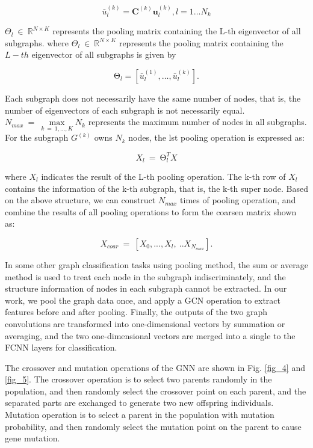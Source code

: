 \documentclass[lettersize,journal]{IEEEtran}
\begin{document}
\begin{equation}
\label{deqn_ex_3}
{\bar{u}}_l^{(k)}=\mathbf{C}^{(k)}\mathbf{u}_l^{(k)},l=1\ldots N_k
\end{equation}

$\Theta_l\ \in\ \mathbb{R}^{N\times K}$ represents the pooling matrix containing the L-th eigenvector of all subgraphs.
where $\Theta_l\ \in\ \mathbb{R}^{N\times K}$ represents the pooling matrix containing the $L-th$ eigenvector of all subgraphs is given by

\begin{equation}
\label{deqn_ex_4}
\mathrm{\Theta}_l=\left[{\bar{u}}_l^{\left(1\right)},\ldots,{\bar{u}}_l^{\left(k\right)}\right].
\end{equation}

Each subgraph does not necessarily have the same number of nodes, that is, the number of eigenvectors of each subgraph is not necessarily equal. $N_{max}\ =\ \underset{k\ =\ 1,...,K}\max{N_k}$ represents the maximum number of nodes in all subgraphs. For the subgraph $G^{(k)}$ owns $N_k$ nodes, the lst pooling operation is expressed as:

\begin{equation}
\label{deqn_ex_5}
X_l\ =\ \mathrm{\Theta}_l^TX
\end{equation}

where $X_l$ indicates the result of the L-th pooling operation. The k-th row of $X_l$ contains the information of the k-th subgraph, that is, the k-th super node. Based on the above structure, we can construct $N_{max}$ times of pooling operation, and combine the results of all pooling operations to form the coarsen matrix shown as:

\begin{equation}
\label{deqn_ex_6}
X_{coar}\ =\ [X_0,...,X_l,\ ..X_{N_{max}}].
\end{equation}

In some other graph classification tasks using pooling method, the sum or average method is used to treat each node in the subgraph indiscriminately, and the structure information of nodes in each subgraph cannot be extracted. In our work, we pool the graph data once, and apply a GCN operation to extract features before and after pooling. Finally, the outputs of the two graph convolutions are transformed into one-dimensional vectors by summation or averaging, and the two one-dimensional vectors are merged into a single to the FCNN layers for classification.

The crossover and mutation operations of the GNN are shown in Fig. \ref{fig_4} and \ref{fig_5}. The crossover operation is to select two parents randomly in the population, and then randomly select the crossover point on each parent, and the separated parts are exchanged to generate two new offspring individuals. Mutation operation is to select a parent in the population with mutation probability, and then randomly select the mutation point on the parent to cause gene mutation.
\end{document}
